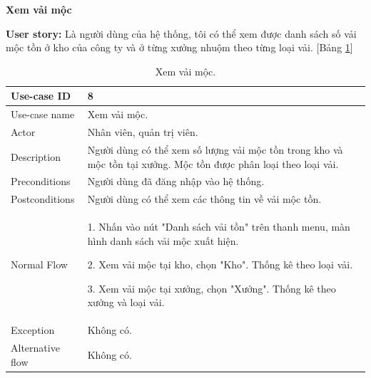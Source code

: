 \textbf{Xem vải mộc}\par
\textbf{User story:} Là người dùng của hệ thống, tôi có thể xem được danh sách số vải mộc tồn ở kho của công ty và ở từng xưởng nhuộm theo từng loại vải. [Bảng \ref{bang8}]
\begin{table}[H]
    \centering
    \begin{tabular}{|m{3cm}|m{10cm}|}
    \hline 
        Use-case ID & 8\\ \hline
        Use-case name & Xem vải mộc.\\ \hline
        Actor & Nhân viên, quản trị viên.\\ \hline
        Description & Người dùng có thể xem số lượng vải mộc tồn trong kho và mộc tồn tại xưởng. Mộc tồn được phân loại theo loại vải.\\ \hline
        Preconditions & Người dùng đã đăng nhập vào hệ thống.\\ \hline
        Postconditions & Người dùng có thể xem các thông tin về vải mộc tồn.\\ \hline
        Normal Flow & 
        1. Nhấn vào nút "Danh sách vải tồn" trên thanh menu, màn hình danh sách vải mộc xuất hiện.\par
        2. Xem vải mộc tại kho, chọn "Kho". Thống kê theo loại vải.\par
        3. Xem vải mộc tại xưởng, chọn "Xưởng". Thống kê theo xưởng và loại vải.
        \\ \hline
        Exception & Không có.\\ \hline
        Alternative flow & Không có.\\ 
    \hline 
    \end{tabular}
    \caption{Xem vải mộc.}
    \label{bang8}
\end{table}


